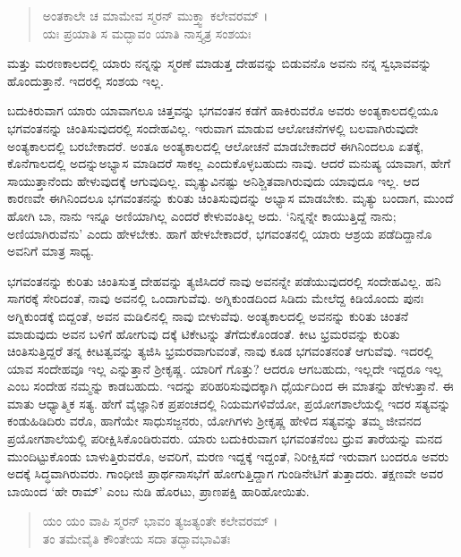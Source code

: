 \begin{verse}
ಅಂತಕಾಲೇ ಚ ಮಾಮೇವ ಸ್ಮರನ್ ಮುಕ್ತ್ವಾ ಕಲೇವರಮ್ ।\\ಯಃ ಪ್ರಯಾತಿ ಸ ಮದ್ಭಾವಂ ಯಾತಿ ನಾಸ್ತ್ಯತ್ರ ಸಂಶಯಃ 
\end{verse}

{\small ಮತ್ತು ಮರಣಕಾಲದಲ್ಲಿ ಯಾರು ನನ್ನನ್ನು ಸ್ಮರಣೆ ಮಾಡುತ್ತ ದೇಹವನ್ನು ಬಿಡುವನೊ ಅವನು ನನ್ನ ಸ್ವಭಾವವನ್ನು ಹೊಂದುತ್ತಾನೆ. ಇದರಲ್ಲಿ ಸಂಶಯ ಇಲ್ಲ.}

ಬದುಕಿರುವಾಗ ಯಾರು ಯಾವಾಗಲೂ ಚಿತ್ತವನ್ನು ಭಗವಂತನ ಕಡೆಗೆ ಹಾಕಿರುವರೊ ಅವರು ಅಂತ್ಯಕಾಲದಲ್ಲಿಯೂ ಭಗವಂತನನ್ನು ಚಿಂತಿಸುವುದರಲ್ಲಿ ಸಂದೇಹವಿಲ್ಲ. ಇರುವಾಗ ಮಾಡುವ ಆಲೋಚನೆಗಳಲ್ಲಿ ಬಲವಾಗಿರುವುದೇ ಅಂತ್ಯಕಾಲದಲ್ಲಿ ಬರಬೇಕಾದರೆ. ಅಂತೂ ಅಂತ್ಯಕಾಲದಲ್ಲಿ ಆಲೋಚನೆ ಮಾಡಬೇಕಾದರೆ ಈಗಿನಿಂದಲೂ ಏತಕ್ಕೆ, ಕೊನೆಗಾಲದಲ್ಲಿ ಅದನ್ನುಅಭ್ಯಾಸ ಮಾಡಿದರೆ ಸಾಕಲ್ಲ ಎಂದುಕೊಳ್ಳಬಹುದು ನಾವು. ಆದರೆ ಮನುಷ್ಯ ಯಾವಾಗ, ಹೇಗೆ ಸಾಯುತ್ತಾನೆಂದು ಹೇಳುವುದಕ್ಕೆ ಆಗುವುದಿಲ್ಲ. ಮೃತ್ಯುವಿನಷ್ಟು ಅನಿಶ್ಚಿತವಾಗಿರುವುದು ಯಾವುದೂ ಇಲ್ಲ. ಆದ ಕಾರಣವೇ ಈಗಿನಿಂದಲೂ ಭಗವಂತನನ್ನು ಕುರಿತು ಚಿಂತಿಸುವುದನ್ನು ಅಭ್ಯಾಸ ಮಾಡಬೇಕು. ಮೃತ್ಯು ಬಂದಾಗ, ಮುಂದೆ ಹೋಗಿ ಬಾ, ನಾನು ಇನ್ನೂ ಅಣಿಯಾಗಿಲ್ಲ ಎಂದರೆ ಕೇಳುವಂತಿಲ್ಲ ಅದು. ‘ನಿನ್ನನ್ನೇ ಕಾಯುತ್ತಿದ್ದೆ ನಾನು; ಅಣಿಯಾಗಿರುವೆನು’ ಎಂದು ಹೇಳಬೇಕು. ಹಾಗೆ ಹೇಳಬೇಕಾದರೆ, ಭಗವಂತನಲ್ಲಿ ಯಾರು ಆಶ್ರಯ ಪಡೆದಿದ್ದಾನೊ ಅವನಿಗೆ ಮಾತ್ರ ಸಾಧ್ಯ.

ಭಗವಂತನನ್ನು ಕುರಿತು ಚಿಂತಿಸುತ್ತ ದೇಹವನ್ನು ತ್ಯಜಿಸಿದರೆ ನಾವು ಅವನನ್ನೇ ಪಡೆಯುವುದರಲ್ಲಿ ಸಂದೇಹವಿಲ್ಲ. ಹನಿ ಸಾಗರಕ್ಕೆ ಸೇರಿದಂತೆ, ನಾವು ಅವನಲ್ಲಿ ಒಂದಾಗುವೆವು. ಅಗ್ನಿಕುಂಡದಿಂದ ಸಿಡಿದು ಮೇಲೆದ್ದ ಕಿಡಿಯೊಂದು ಪುನಃ ಅಗ್ನಿಕುಂಡಕ್ಕೆ ಬಿದ್ದಂತೆ, ಅವನ ಮಡಿಲಿನಲ್ಲಿ ನಾವು ಬೀಳುವೆವು. ಅಂತ್ಯಕಾಲದಲ್ಲಿ ಅವನನ್ನು ಕುರಿತು ಚಿಂತನೆ ಮಾಡುವುದು ಅವನ ಬಳಿಗೆ ಹೋಗುವು ದಕ್ಕೆ ಟಿಕೇಟನ್ನು ತೆಗೆದುಕೊಂಡಂತೆ. ಕೀಟ ಭ್ರಮರವನ್ನು ಕುರಿತು ಚಿಂತಿಸುತ್ತಿದ್ದರೆ ತನ್ನ ಕೀಟತ್ವವನ್ನು ತ್ಯಜಿಸಿ ಭ್ರಮರವಾಗುವಂತೆ, ನಾವು ಕೂಡ ಭಗವಂತನಂತೆ ಆಗುವೆವು. ಇದರಲ್ಲಿ ಯಾವ ಸಂದೇಹವೂ ಇಲ್ಲ ಎನ್ನುತ್ತಾನೆ ಶ್ರೀಕೃಷ್ಣ. ಯಾರಿಗೆ ಗೊತ್ತು? ಆದರೂ ಆಗಬಹುದು, ಇಲ್ಲದೇ ಇದ್ದರೂ ಇಲ್ಲ ಎಂಬ ಸಂದೇಹ ನಮ್ಮನ್ನು ಕಾಡಬಹುದು. ಇದನ್ನು ಪರಿಹರಿಸುವುದಕ್ಕಾಗಿ ಧೈರ್ಯದಿಂದ ಈ ಮಾತನ್ನು ಹೇಳುತ್ತಾನೆ. ಈ ಮಾತು ಆಧ್ಯಾತ್ಮಿಕ ಸತ್ಯ. ಹೇಗೆ ವೈಜ್ಞಾನಿಕ ಪ್ರಪಂಚದಲ್ಲಿ ನಿಯಮಗಳಿವೆಯೋ, ಪ್ರಯೋಗಶಾಲೆಯಲ್ಲಿ ಇದರ ಸತ್ಯವನ್ನು ಕಂಡುಹಿಡಿದಿರು ವರೊ, ಹಾಗೆಯೇ ಸಾಧುಸಜ್ಜನರು, ಯೋಗಿಗಳು ಶ್ರೀಕೃಷ್ಣ ಹೇಳಿದ ಸತ್ಯವನ್ನು ತಮ್ಮ ಜೀವನದ ಪ್ರಯೋಗಶಾಲೆಯಲ್ಲಿ ಪರೀಕ್ಷಿಸಿಕೊಂಡಿರುವರು. ಯಾರು ಬದುಕಿರುವಾಗ ಭಗವಂತನೆಂಬ ಧ್ರುವ ತಾರೆಯನ್ನು ಮನದ ಮುಂದಿಟ್ಟುಕೊಂಡು ಬಾಳುತ್ತಿರುವರೊ, ಅವರಿಗೆ, ಮರಣ ಇದ್ದಕ್ಕೆ ಇದ್ದಂತೆ, ನಿರೀಕ್ಷಿಸದೆ ಇರುವಾಗ ಬಂದರೂ ಅವರು ಅದಕ್ಕೆ ಸಿದ್ಧವಾಗಿರುವರು. ಗಾಂಧೀಜಿ ಪ್ರಾರ್ಥನಾಸಭೆಗೆ ಹೋಗುತ್ತಿದ್ದಾಗ ಗುಂಡಿನೇಟಿಗೆ ತುತ್ತಾದರು. ತಕ್ಷಣವೇ ಅವರ ಬಾಯಿಂದ ‘ಹೇ ರಾಮ್​’ ಎಂಬ ನುಡಿ ಹೊರಟು, ಪ್ರಾಣಪಕ್ಷಿ ಹಾರಿಹೋಯಿತು.

\begin{verse}
ಯಂ ಯಂ ವಾಪಿ ಸ್ಮರನ್ ಭಾವಂ ತ್ಯಜತ್ಯಂತೇ ಕಲೇವರಮ್ ।\\ತಂ ತಮೇವೈತಿ ಕೌಂತೇಯ ಸದಾ ತದ್ಭಾವಭಾವಿತಃ 
\end{verse}

